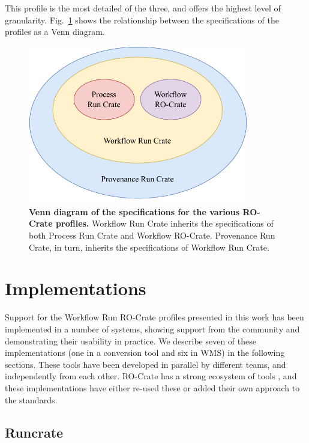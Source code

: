 \documentclass[10pt,letterpaper]{article}
\begin{document}
This profile is the most detailed of the three, and offers the highest level of granularity. Fig.~\ref{fig:profile_venn} shows the relationship between the specifications of the profiles as a Venn diagram.

\begin{figure}[!h]
  \includegraphics[width=26em]{wrroc-venn.drawio.pdf}
  \caption{{\bf Venn diagram of the specifications for the various RO-Crate profiles.}
  Workflow Run Crate inherits the specifications of both Process Run Crate and Workflow RO-Crate. Provenance Run Crate, in turn, inherits the specifications of Workflow Run Crate.}
  \label{fig:profile_venn}
  \end{figure}


\section{Implementations}\label{implementations}

Support for the Workflow Run RO-Crate profiles presented in this work has been implemented in a number of systems, showing support from the community and demonstrating their usability in practice.
We describe seven of these implementations (one in a conversion tool and six in WMS) in the following sections.
These tools have been developed in parallel by different teams, and independently from each other. 
RO-Crate has a strong ecosystem of tools \cite{Soiland-Reyes 2022a}, and these implementations have either re-used these or added their own approach to the standards.


\subsection{Runcrate}\label{runcrate}
\end{document}
